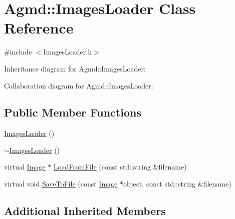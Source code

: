 \hypertarget{class_agmd_1_1_images_loader}{\section{Agmd\+:\+:Images\+Loader Class Reference}
\label{class_agmd_1_1_images_loader}
}


{\ttfamily \#include $<$Images\+Loader.\+h$>$}



Inheritance diagram for Agmd\+:\+:Images\+Loader\+:


Collaboration diagram for Agmd\+:\+:Images\+Loader\+:
\subsection*{Public Member Functions}
\begin{DoxyCompactItemize}
\item 
\hyperlink{class_agmd_1_1_images_loader_ae0209f7c22b7025117e0a23521fec013}{Images\+Loader} ()
\item 
\hyperlink{class_agmd_1_1_images_loader_a8f489d3e9d1ad06506a813414dff447b}{$\sim$\+Images\+Loader} ()
\item 
virtual \hyperlink{class_agmd_1_1_image}{Image} $\ast$ \hyperlink{class_agmd_1_1_images_loader_a4b5126c9f0e9a64f121f33f69c1027db}{Load\+From\+File} (const std\+::string \&filename)
\item 
virtual void \hyperlink{class_agmd_1_1_images_loader_a60ce8f960efd5b94565ec77dc8e5a40a}{Save\+To\+File} (const \hyperlink{class_agmd_1_1_image}{Image} $\ast$object, const std\+::string \&filename)
\end{DoxyCompactItemize}
\subsection*{Additional Inherited Members}


